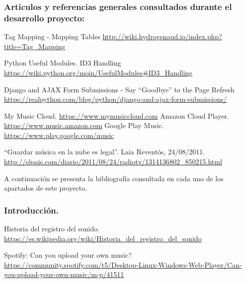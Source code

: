 
\subsubsection*{Articulos y referencias generales consultados durante el desarrollo proyecto:}

 Tag Mapping - Mapping Tables \url{http://wiki.hydrogenaud.io/index.php?title=Tag_Mapping}

 Python Useful Modules. ID3 Handling \url{https://wiki.python.org/moin/UsefulModules#ID3_Handling}

 Django and AJAX Form Submissions - Say ``Goodbye'' to the Page Refresh \url{https://realpython.com/blog/python/django-and-ajax-form-submissions/}

 My Music Cloud. \url{https://www.mymusiccloud.com}
 Amazon Cloud Player. \url{https://www.music.amazon.com}
 Google Play Music. \url{https://www.play.google.com/music}

 ``Guardar música en la nube es legal''. Laia Reventós, 24/08/2011. \url{http://elpais.com/diario/2011/08/24/radiotv/1314136802_850215.html}


A continuación se presenta la bibliografía consultada en cada uno de los apartados de este proyecto.

\bigskip

\subsubsection*{Introducción.}

 Historia del registro del sonido. \url{https://es.wikipedia.org/wiki/Historia_del_registro_del_sonido}

 Spotify: Can you upload your own music? \url{https://community.spotify.com/t5/Desktop-Linux-Windows-Web-Player/Can-you-upload-your-own-music/m-p/41511}

